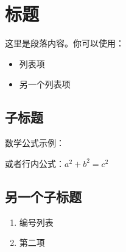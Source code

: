 
\section{标题}

这里是段落内容。你可以使用：
\begin{itemize}
    \item 列表项
    \item 另一个列表项
\end{itemize}

\subsection{子标题}

数学公式示例：

或者行内公式：$a^2 + b^2 = c^2$

\subsection{另一个子标题}

\begin{enumerate}
    \item 编号列表
    \item 第二项
\end{enumerate}
